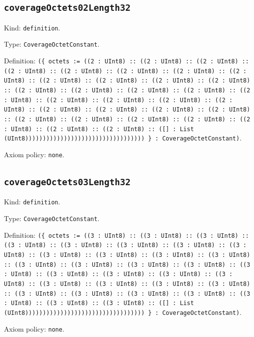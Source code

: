 \documentclass[11pt]{article}
\begin{document}
\subsection*{\texttt{coverageOctets02Length32}}
\noindent Kind: \texttt{definition}.\par
\noindent Type: \texttt{CoverageOctetConstant}.\par
\noindent Definition: \texttt{(\{ octets := ((2 : UInt8) :: ((2 : UInt8) :: ((2 : UInt8) :: ((2 : UInt8) :: ((2 : UInt8) :: ((2 : UInt8) :: ((2 : UInt8) :: ((2 : UInt8) :: ((2 : UInt8) :: ((2 : UInt8) :: ((2 : UInt8) :: ((2 : UInt8) :: ((2 : UInt8) :: ((2 : UInt8) :: ((2 : UInt8) :: ((2 : UInt8) :: ((2 : UInt8) :: ((2 : UInt8) :: ((2 : UInt8) :: ((2 : UInt8) :: ((2 : UInt8) :: ((2 : UInt8) :: ((2 : UInt8) :: ((2 : UInt8) :: ((2 : UInt8) :: ((2 : UInt8) :: ((2 : UInt8) :: ((2 : UInt8) :: ((2 : UInt8) :: ((2 : UInt8) :: ((2 : UInt8) :: ((2 : UInt8) :: ([] : List (UInt8)))))))))))))))))))))))))))))))))) \} : CoverageOctetConstant)}.\par
\noindent Axiom policy: \texttt{none}.\par
\subsection*{\texttt{coverageOctets03Length32}}
\noindent Kind: \texttt{definition}.\par
\noindent Type: \texttt{CoverageOctetConstant}.\par
\noindent Definition: \texttt{(\{ octets := ((3 : UInt8) :: ((3 : UInt8) :: ((3 : UInt8) :: ((3 : UInt8) :: ((3 : UInt8) :: ((3 : UInt8) :: ((3 : UInt8) :: ((3 : UInt8) :: ((3 : UInt8) :: ((3 : UInt8) :: ((3 : UInt8) :: ((3 : UInt8) :: ((3 : UInt8) :: ((3 : UInt8) :: ((3 : UInt8) :: ((3 : UInt8) :: ((3 : UInt8) :: ((3 : UInt8) :: ((3 : UInt8) :: ((3 : UInt8) :: ((3 : UInt8) :: ((3 : UInt8) :: ((3 : UInt8) :: ((3 : UInt8) :: ((3 : UInt8) :: ((3 : UInt8) :: ((3 : UInt8) :: ((3 : UInt8) :: ((3 : UInt8) :: ((3 : UInt8) :: ((3 : UInt8) :: ((3 : UInt8) :: ([] : List (UInt8)))))))))))))))))))))))))))))))))) \} : CoverageOctetConstant)}.\par
\noindent Axiom policy: \texttt{none}.\par
\end{document}
